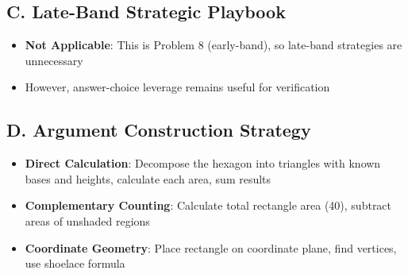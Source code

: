 \documentclass[11pt]{article}
\begin{document}
\begin{strategicbox}
\subsection*{C. Late-Band Strategic Playbook}
\begin{itemize}[leftmargin=*]
    \item \textbf{Not Applicable}: This is Problem 8 (early-band), so late-band strategies are unnecessary
    \item However, answer-choice leverage remains useful for verification
\end{itemize}

\subsection*{D. Argument Construction Strategy}
\begin{itemize}[leftmargin=*]
    \item \textbf{Direct Calculation}: Decompose the hexagon into triangles with known bases and heights, calculate each area, sum results
    \item \textbf{Complementary Counting}: Calculate total rectangle area (40), subtract areas of unshaded regions
    \item \textbf{Coordinate Geometry}: Place rectangle on coordinate plane, find vertices, use shoelace formula
\end{itemize}
\end{strategicbox}
\end{document}
